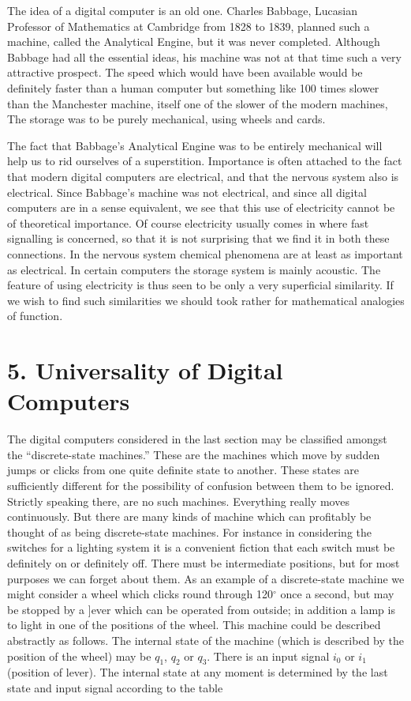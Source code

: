 \documentclass[10pt,twoside,openright]{memoir}
\begin{document}
The idea of a digital computer is an old one. Charles Babbage, Lucasian Professor of Mathematics at Cambridge from 1828 to 1839, planned such a machine, called the Analytical Engine, but it was never completed. Although Babbage had all the essential ideas, his machine was not at that time such a very attractive prospect. The speed which would have been available would be definitely faster than a human computer but something like 100 times slower than the Manchester machine, itself one of the slower of the modern machines, The storage was to be purely mechanical, using wheels and cards.

The fact that Babbage's Analytical Engine was to be entirely mechanical will help us to rid ourselves of a superstition. Importance is often attached to the fact that modern digital computers are electrical, and that the nervous system also is electrical. Since Babbage's machine was not electrical, and since all digital computers are in a sense equivalent, we see that this use of electricity cannot be of theoretical importance. Of course electricity usually comes in where fast signalling is concerned, so that it is not surprising that we find it in both these connections. In the nervous system chemical phenomena are at least as important as electrical. In certain computers the storage system is mainly acoustic. The feature of using electricity is thus seen to be only a very superficial similarity. If we wish to find such similarities we should took rather for mathematical analogies of function.

\section{5. Universality of Digital Computers}

The digital computers considered in the last section may be classified amongst the ``discrete-state machines.'' These are the machines which move by sudden jumps or clicks from one quite definite state to another. These states are sufficiently different for the possibility of confusion between them to be ignored. Strictly speaking there, are no such machines. Everything really moves continuously. But there are many kinds of machine which can profitably be thought of as being discrete-state machines. For instance in considering the switches for a lighting system it is a convenient fiction that each switch must be definitely on or definitely off. There must be intermediate positions, but for most purposes we can forget about them. As an example of a discrete-state machine we might consider a wheel which clicks round through 120$^{\circ}$ once a second, but may be stopped by a ]ever which can be operated from outside; in addition a lamp is to light in one of the positions of the wheel. This machine could be described abstractly as follows. The internal state of the machine (which is described by the position of the wheel) may be $q_1$, $q_2$ or $q_3$. There is an input signal $i_0$ or $i_1$ (position of lever). The internal state at any moment is determined by the last state and input signal according to the table
\end{document}

